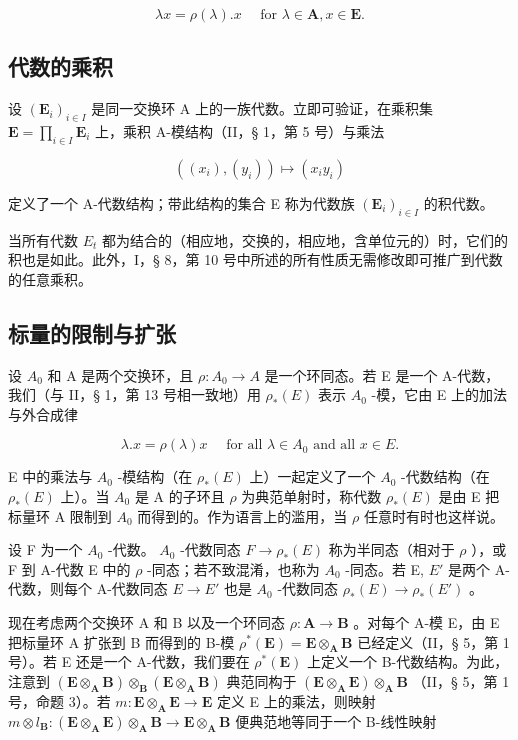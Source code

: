 \[
\lambda x = \rho (\lambda). x \quad \text { for } \lambda \in \mathbf {A}, x \in \mathbf {E}.
\]

\subsection{代数的乘积}

设 \((\mathbf{E}_i)_{i\in I}\) 是同一交换环 A 上的一族代数。立即可验证，在乘积集 \(\mathbf{E} = \prod_{i\in I}\mathbf{E}_i\) 上，乘积 A-模结构（II，§ 1，第 5 号）与乘法

\[
\left(\left(x _ {i}\right), \left(y _ {i}\right)\right) \mapsto \left(x _ {i} y _ {i}\right)\tag{4}
\]

定义了一个 A-代数结构；带此结构的集合 E 称为代数族 \((\mathbf{E}_{i})_{i\in I}\) 的积代数。

当所有代数 \(E_{t}\) 都为结合的（相应地，交换的，相应地，含单位元的）时，它们的积也是如此。此外，I，§ 8，第 10 号中所述的所有性质无需修改即可推广到代数的任意乘积。

\subsection{标量的限制与扩张}

设 \(A_{0}\) 和 A 是两个交换环，且 \(\rho:A_{0}\to A\) 是一个环同态。若 E 是一个 A-代数，我们（与 II，§ 1，第 13 号相一致地）用 \(\rho_{*}(E)\) 表示 \(A_{0}\) -模，它由 E 上的加法与外合成律

\[
\lambda . x = \rho (\lambda) x \quad \text { for   all } \lambda \in A _ {0} \text { and   all } x \in E.
\]

E 中的乘法与 \(A_{0}\) -模结构（在 \(\rho_{*}(E)\) 上）一起定义了一个 \(A_{0}\) -代数结构（在 \(\rho_{*}(E)\) 上）。当 \(A_{0}\) 是 A 的子环且 \(\rho\) 为典范单射时，称代数 \(\rho_{*}(E)\) 是由 E 把标量环 A 限制到 \(A_{0}\) 而得到的。作为语言上的滥用，当 \(\rho\) 任意时有时也这样说。

设 F 为一个 \(A_{0}\) -代数。 \(A_{0}\) -代数同态 \(F \to \rho_{*}(E)\) 称为半同态（相对于 \(\rho\) ），或 F 到 A-代数 E 中的 \(\rho\) -同态；若不致混淆，也称为 \(A_{0}\) -同态。若 E, \(E'\) 是两个 A-代数，则每个 A-代数同态 \(E \to E'\) 也是 \(A_{0}\) -代数同态 \(\rho_{*}(E) \to \rho_{*}(E')\) 。

现在考虑两个交换环 A 和 B 以及一个环同态 \(\rho: \mathbf{A} \to \mathbf{B}\) 。对每个 A-模 E，由 E 把标量环 A 扩张到 B 而得到的 B-模 \(\rho^{*}(\mathbf{E}) = \mathbf{E} \otimes_{\mathbf{A}} \mathbf{B}\) 已经定义（II，§ 5，第 1 号）。若 E 还是一个 A-代数，我们要在 \(\rho^{*}(\mathbf{E})\) 上定义一个 B-代数结构。为此，注意到 \((\mathbf{E} \otimes_{\mathbf{A}} \mathbf{B}) \otimes_{\mathbf{B}} (\mathbf{E} \otimes_{\mathbf{A}} \mathbf{B})\) 典范同构于 \((\mathbf{E} \otimes_{\mathbf{A}} \mathbf{E}) \otimes_{\mathbf{A}} \mathbf{B}\) （II，§ 5，第 1 号，命题 3）。若 \(m: \mathbf{E} \otimes_{\mathbf{A}} \mathbf{E} \to \mathbf{E}\) 定义 E 上的乘法，则映射 \(m \otimes l_{\mathbf{B}}: (\mathbf{E} \otimes_{\mathbf{A}} \mathbf{E}) \otimes_{\mathbf{A}} \mathbf{B} \to \mathbf{E} \otimes_{\mathbf{A}} \mathbf{B}\) 便典范地等同于一个 B-线性映射

